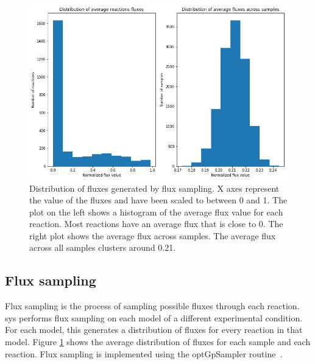 \begin{figure}[t!]
\begin{center}
\includegraphics[width=\textwidth]{figs/fluxdistribution.png}
\caption[Distribution of fluxes generated by flux sampling]{Distribution of fluxes generated by flux sampling.
X axes represent the value of the fluxes and have been scaled to between 0 and 1.
The plot on the left shows a histogram of the average flux value for each reaction.
Most reactions have an average flux that is close to 0.
The right plot shows the average flux across samples.
The average flux across all samples clusters around 0.21. 
}
\label{fig:distrib}
\end{center}
\end{figure}

\subsection{Flux sampling}
Flux sampling is the process of sampling possible fluxes through each reaction.
\gls{sys} performs flux sampling on each model of a different experimental condition.
For each model, this generates a distribution of fluxes for every reaction in that model.
Figure \ref{fig:distrib} shows the average distribution of fluxes for each sample and each reaction.
Flux sampling is implemented using the optGpSampler routine~\cite{megchelenbrink2014optgpsampler}.

